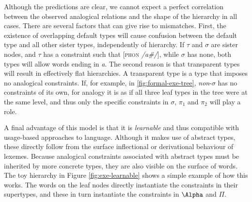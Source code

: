 Although the predictions are clear, we cannot expect a perfect correlation between the observed analogical relations and the shape of the hierarchy in all cases. There are several factors that can give rise to mismatches. First, the existence of overlapping default types will cause confusion between the default type and all other sister types, independently of hierarchy. If $\tau$ and $\sigma$ are sister nodes, and $\tau$ has a constraint such that [\textsc{phon} \textit{/a\#/}], while $\sigma$ has none, both types will allow words ending in \textit{a}. The second reason is that transparent types will result in effectively flat hierarchies. A transparent type is a type that imposes no analogical constraints. If, for example, in \ref{fig:formal-exe-tree}, \textit{non}-$\sigma$ has no constraints of its own, for analogy it is as if all three leaf types in the tree were at the same level, and thus only the specific constraints in $\sigma$, $\pi_1$ and $\pi_2$ will play a role.

A final advantage of this model is that it is \textit{learnable} and thus compatible with usage-based approaches to language. Although it makes use of abstract types, these directly follow from the surface inflectional or derivational behaviour of lexemes. Because analogical constraints associated with abstract types must be inherited by more concrete types, they are also visible on the surface of words. The toy hierarchy in Figure \ref{fig:exe-learnable} shows a simple example of how this works. The words on the leaf nodes directly instantiate the constraints in their supertypes, and these in turn instantiate the constraints in $\Alpha$ and $\Pi$.

